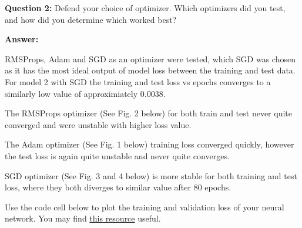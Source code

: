 \documentclass[11pt]{article}
\begin{document}
\textbf{Question 2:} Defend your choice of optimizer. Which optimizers
did you test, and how did you determine which worked best?

\textbf{Answer:}

RMSProps, Adam and SGD as an optimizer were tested, which SGD was chosen
as it has the most ideal output of model loss between the training and
test data. For model 2 with SGD the training and test loss vs epochs
converges to a similarly low value of approximiately 0.0038.

The RMSProps optimizer (See Fig. 2 below) for both train and test never
quite converged and were unstable with higher loss value.

The Adam optimizer (See Fig. 1 below) training loss converged quickly,
however the test loss is again quite unstable and never quite converges.

SGD optimizer (See Fig. 3 and 4 below) is more stable for both training
and test loss, where they both diverges to similar value after 80
epochs.

Use the code cell below to plot the training and validation loss of your
neural network. You may find
\href{http://machinelearningmastery.com/display-deep-learning-model-training-history-in-keras/}{this
resource} useful.
\end{document}
